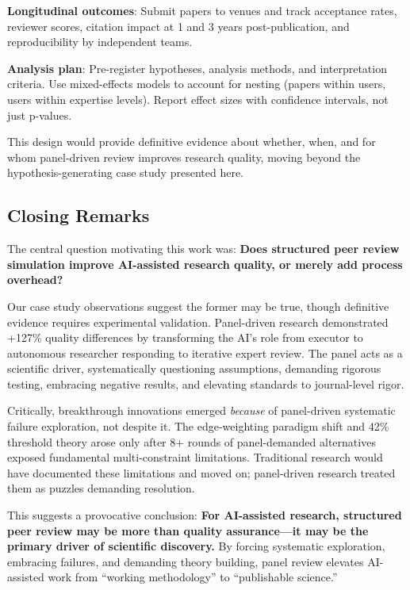 \textbf{Longitudinal outcomes}: Submit papers to venues and track acceptance rates, reviewer scores, citation impact at 1 and 3 years post-publication, and reproducibility by independent teams.

\textbf{Analysis plan}: Pre-register hypotheses, analysis methods, and interpretation criteria. Use mixed-effects models to account for nesting (papers within users, users within expertise levels). Report effect sizes with confidence intervals, not just p-values.

This design would provide definitive evidence about whether, when, and for whom panel-driven review improves research quality, moving beyond the hypothesis-generating case study presented here.

\subsection{Closing Remarks}

The central question motivating this work was: \textbf{Does structured peer review simulation improve AI-assisted research quality, or merely add process overhead?}

Our case study observations suggest the former may be true, though definitive evidence requires experimental validation. Panel-driven research demonstrated +127\% quality differences by transforming the AI's role from executor to autonomous researcher responding to iterative expert review. The panel acts as a scientific driver, systematically questioning assumptions, demanding rigorous testing, embracing negative results, and elevating standards to journal-level rigor.

Critically, breakthrough innovations emerged \emph{because} of panel-driven systematic failure exploration, not despite it. The edge-weighting paradigm shift and 42\% threshold theory arose only after 8+ rounds of panel-demanded alternatives exposed fundamental multi-constraint limitations. Traditional research would have documented these limitations and moved on; panel-driven research treated them as puzzles demanding resolution.

This suggests a provocative conclusion: \textbf{For AI-assisted research, structured peer review may be more than quality assurance---it may be the primary driver of scientific discovery.} By forcing systematic exploration, embracing failures, and demanding theory building, panel review elevates AI-assisted work from ``working methodology'' to ``publishable science.''

